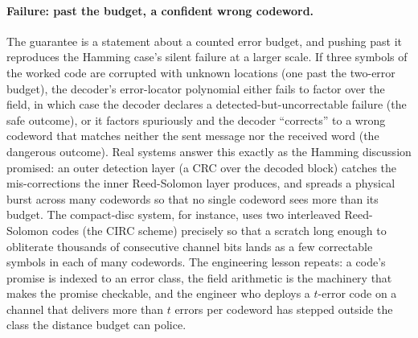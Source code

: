 \paragraph{Failure: past the budget, a confident wrong codeword.}
The guarantee is a statement about a counted error budget, and
pushing past it reproduces the Hamming case's silent failure at a
larger scale. If three symbols of the worked code are corrupted with
unknown locations (one past the two-error budget), the decoder's
error-locator polynomial either fails to factor over the field, in
which case the decoder declares a detected-but-uncorrectable failure
(the safe outcome), or it factors spuriously and the decoder
``corrects'' to a wrong codeword that matches neither the sent message
nor the received word (the dangerous outcome). Real systems answer
this exactly as the Hamming discussion promised: an outer detection
layer (a CRC over the decoded block) catches the mis-corrections the
inner Reed-Solomon layer produces, and  spreads
a physical burst across many codewords so that no single codeword sees
more than its budget. The compact-disc system, for instance, uses two
interleaved Reed-Solomon codes (the CIRC scheme) precisely so that a
scratch long enough to obliterate thousands of consecutive channel
bits lands as a few correctable symbols in each of many codewords. The
engineering lesson repeats: a code's promise is indexed to an error
class, the field arithmetic is the machinery that makes the promise
checkable, and the engineer who deploys a $t$-error code on a channel
that delivers more than $t$ errors per codeword has stepped outside
the class the distance budget can police.

